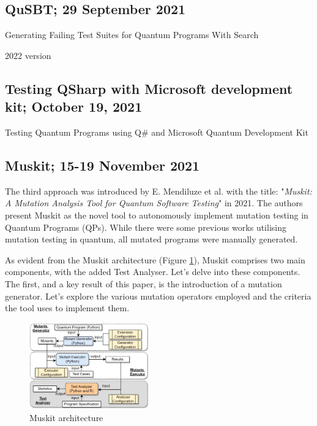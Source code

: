 \begin{itemize}
\vspace{15pt}
\subsection{QuSBT; 29 September 2021}

Generating Failing Test Suites for Quantum Programs With Search \cite{wang2021generating}

2022 version \cite{wang2022qusbt}

\vspace{15pt}
\subsection{Testing QSharp with Microsoft development kit; October 19, 2021}

Testing Quantum Programs using Q$\#$ and Microsoft Quantum
Development Kit \cite{mykhailova2021testing}

\vspace{15pt}
\subsection{Muskit; 15-19 November 2021}
\label{Ch3.2.3:Muskit}
The third approach was introduced by E. Mendiluze et al. with the title: "\textit{Muskit: A Mutation Analysis Tool for Quantum Software Testing}"\cite{mendiluze2021muskit} in 2021. The authors present Muskit as the novel tool to autonomously implement mutation testing in Quantum Programs (QPs). While there were some previous works\cite{ali2021assessing}\cite{wang2021quito} utilising mutation testing in quantum, all mutated programs were manually generated.\newline

As evident from the Muskit architecture (Figure \ref{Fig:MuskitArch}), Muskit comprises two main components, with the added Test Analyser. Let's delve into these components. The first, and a key result of this paper, is the introduction of a mutation generator. Let's explore the various mutation operators employed and the criteria the tool uses to implement them.

\begin{figure}[H]
        \centering
        \includegraphics[width=0.46\textwidth]{TFM/photos/MuskitOverview.png}
        \caption{Muskit architecture \cite{mendiluze2021muskit}} 
        \label{Fig:MuskitArch}
\end{figure}


\end{itemize}
